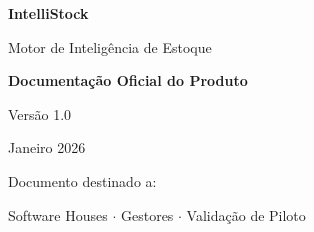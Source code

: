 \documentclass[12pt,a4paper]{article}
\begin{document}
\begin{titlepage}
\centering
\vspace*{3cm}

{\Huge\bfseries IntelliStock\par}
\vspace{0.5cm}
{\Large Motor de Inteligência de Estoque\par}
\vspace{2cm}

{\large\textbf{Documentação Oficial do Produto}\par}
\vspace{1cm}

{\normalsize Versão 1.0\par}
\vspace{0.5cm}
{\normalsize Janeiro 2026\par}

\vfill

{\small Documento destinado a:\par}
{\small Software Houses $\cdot$ Gestores $\cdot$ Validação de Piloto\par}

\end{titlepage}

\tableofcontents
\newpage


\newpage


\newpage


\newpage


\end{document}
